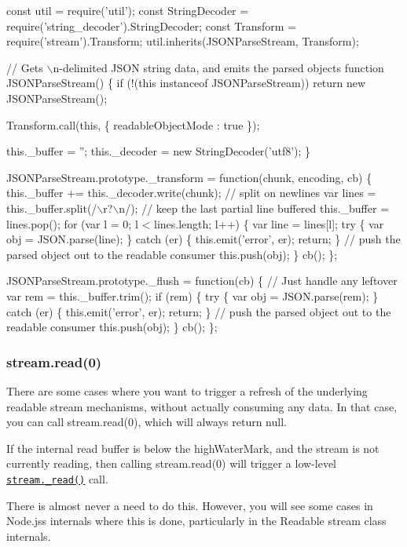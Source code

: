 \begin{DoxyCode}
const util = require('util');
const StringDecoder = require('string\_decoder').StringDecoder;
const Transform = require('stream').Transform;
util.inherits(JSONParseStream, Transform);

// Gets \(\backslash\)n-delimited JSON string data, and emits the parsed objects
function JSONParseStream() \{
  if (!(this instanceof JSONParseStream))
    return new JSONParseStream();

  Transform.call(this, \{ readableObjectMode : true \});

  this.\_buffer = '';
  this.\_decoder = new StringDecoder('utf8');
\}

JSONParseStream.prototype.\_transform = function(chunk, encoding, cb) \{
  this.\_buffer += this.\_decoder.write(chunk);
  // split on newlines
  var lines = this.\_buffer.split(/\(\backslash\)r?\(\backslash\)n/);
  // keep the last partial line buffered
  this.\_buffer = lines.pop();
  for (var l = 0; l < lines.length; l++) \{
    var line = lines[l];
    try \{
      var obj = JSON.parse(line);
    \} catch (er) \{
      this.emit('error', er);
      return;
    \}
    // push the parsed object out to the readable consumer
    this.push(obj);
  \}
  cb();
\};

JSONParseStream.prototype.\_flush = function(cb) \{
  // Just handle any leftover
  var rem = this.\_buffer.trim();
  if (rem) \{
    try \{
      var obj = JSON.parse(rem);
    \} catch (er) \{
      this.emit('error', er);
      return;
    \}
    // push the parsed object out to the readable consumer
    this.push(obj);
  \}
  cb();
\};
\end{DoxyCode}


\subsubsection*{{\ttfamily stream.\+read(0)}}

There are some cases where you want to trigger a refresh of the underlying readable stream mechanisms, without actually consuming any data. In that case, you can call {\ttfamily stream.\+read(0)}, which will always return null.

If the internal read buffer is below the {\ttfamily high\+Water\+Mark}, and the stream is not currently reading, then calling {\ttfamily stream.\+read(0)} will trigger a low-\/level \href{#stream_readable_read_size_1}{\tt {\ttfamily stream.\+\_\+read()}} call.

There is almost never a need to do this. However, you will see some cases in Node.\+js\textquotesingle{}s internals where this is done, particularly in the Readable stream class internals.

